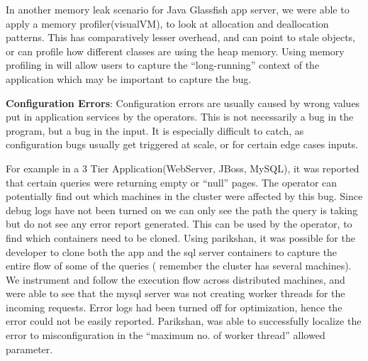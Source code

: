 In another memory leak scenario for Java Glassfish\cite{glassfish} app server, we were able to apply a memory profiler(visualVM), to look at allocation and deallocation patterns.
This has comparatively lesser overhead, and can point to stale objects, or can profile how different classes are using the heap memory.
Using memory profiling in \parikshan will allow users to capture the ``long-running'' context of the application which may be important to capture the bug.

\noindent
\textbf{Configuration Errors}:
Configuration errors are usually caused by wrong values put in application services by the operators.
This is not necessarily a bug in the program, but a bug in the input.
It is especially difficult to catch, as configuration bugs usually get triggered at scale, or for certain edge cases inputs.

For example in a 3 Tier Application(WebServer, JBoss, MySQL), it was reported that certain queries were returning empty or ``null'' pages. 
The operator can potentially find out which machines in the cluster were affected by this bug.
Since debug logs have not been turned on we can only see the path the query is taking but do not see any error report generated.
This can be used by the operator, to find which containers need to be cloned. 
Using parikshan, it was possible for the developer to clone both the app and the sql server containers to capture the entire flow of some of the queries ( remember the cluster has several machines).
We instrument and follow the execution flow across distributed machines, and were able to see that the mysql server was not creating worker threads for the incoming requests.
Error logs had been turned off for optimization, hence the error could not be easily reported. 
Parikshan, was able to successfully localize the error to misconfiguration in the ``maximum no. of worker thread'' allowed parameter.



